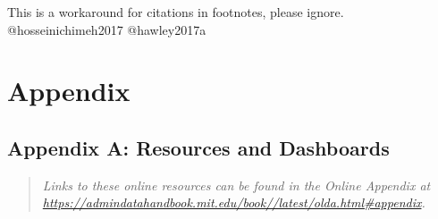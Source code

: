 \begin{invisible}
This is a workaround for citations in footnotes, please ignore.
@hosseinichimeh2017 @hawley2017a
\end{invisible}

\putbib

\FloatBarrier\newpage

\hypertarget{appendix-2}{%
\section*{Appendix}\label{appendix-2}}

\hypertarget{appendix-a-resources-and-dashboards}{%
\subsection*{Appendix A: Resources and Dashboards}\label{appendix-a-resources-and-dashboards}}

\begin{quote}\itshape
Links to these online resources can be found in the Online Appendix at \url{https://admindatahandbook.mit.edu/book//latest/olda.html#appendix}.
\end{quote}








